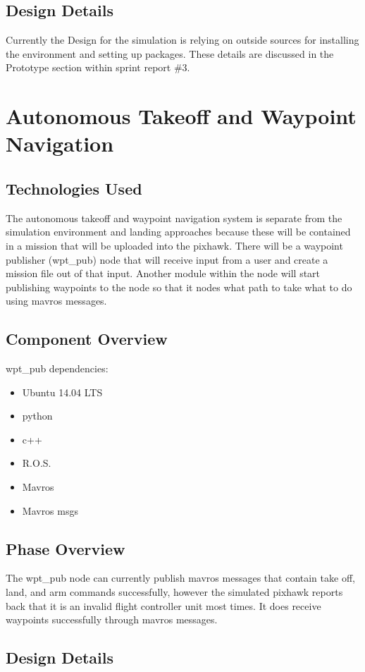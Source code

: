 \subsection{Design Details}
Currently the Design for the simulation is relying on outside sources for installing the environment and setting up packages. These details are discussed in the Prototype section within sprint report \#3.


\section{Autonomous Takeoff and Waypoint Navigation} 
\subsection{Technologies  Used}
The autonomous takeoff and waypoint navigation system is separate from the simulation environment and landing approaches because these will be contained in a mission that will be uploaded into the pixhawk. There will be a waypoint publisher (wpt\_pub) node that will receive input from a user and create a mission file out of that input. Another module within the node will start publishing waypoints to the node so that it nodes what path to take what to do using mavros messages.
\subsection{Component  Overview}
wpt\_pub dependencies:
\begin{itemize}
  \item Ubuntu 14.04 LTS
  \item python
  \item c++
  \item R.O.S.
  \item Mavros
  \item Mavros msgs
\end{itemize}
\subsection{Phase Overview}
The wpt\_pub node can currently publish mavros messages that contain take off, land, and arm commands successfully, however the simulated pixhawk reports back that it is an invalid flight controller unit most times. It does receive waypoints successfully through mavros messages.
\subsection{Design Details}





